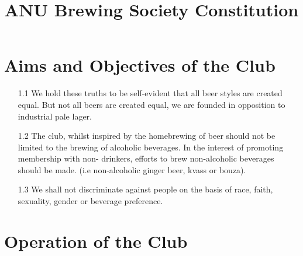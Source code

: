 \documentclass{article}
\title{ANU Brewing Society Constitution}
\author{}
\date{}
\begin{document}
\maketitle

\section{Aims and Objectives of the Club}

\begin{enumerate}
    \item[1.1] We hold these truths to be self-evident that all beer styles are created equal. But not all beers are created equal, we are founded in opposition to industrial pale lager.
    \item[1.2] The club, whilst inspired by the homebrewing of beer should not be limited to the brewing of alcoholic beverages. In the interest of promoting membership with non- drinkers, efforts to brew non-alcoholic beverages should be made. (i.e non-alcoholic ginger beer, kvass or bouza).
    \item[1.3] We shall not discriminate against people on the basis of race, faith, sexuality, gender or beverage preference.
\end{enumerate}

\section{Operation of the Club}
\end{document}
